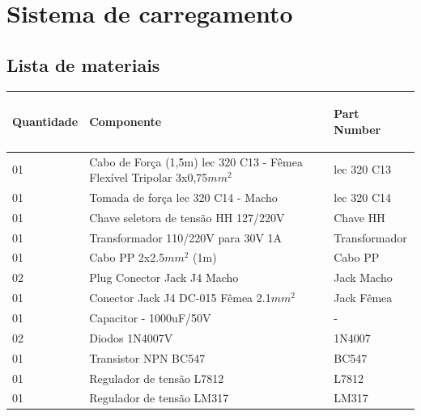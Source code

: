 \chapter{Sistema de carregamento}

\section{Lista de materiais}

\begin{table}[H]
\centering
\begin{tabular}{|m{1.8cm} |m{8.8cm}|m{3.5cm}|}
\hline
\begin{center}Quantidade\end{center} & \begin{center}Componente\end{center} &\begin{center} Part Number\end{center} \\\hline

 01&Cabo de Força (1,5m) lec 320 C13 - Fêmea Flexível Tripolar 3x0,75$mm^2$ & lec 320 C13 \\\hline
 
01 &  Tomada de força lec 320 C14 - Macho
& lec 320 C14 \\\hline
  
01& Chave seletora de tensão HH 127/220V  & Chave HH \\\hline
   
01& Transformador 110/220V para 30V 1A & Transformador \\\hline

01&Cabo PP 2x2.5$mm^2$ (1m) & Cabo PP \\\hline

02&Plug Conector Jack J4  Macho & Jack Macho \\\hline

01& Conector Jack J4 DC-015 Fêmea 2.1$mm^2$ &Jack Fêmea \\\hline

01& Capacitor - 1000uF/50V & - \\\hline

02& Diodos 1N4007V & 1N4007  \\\hline

01& Transistor NPN BC547 & BC547\\\hline

01& Regulador de tensão L7812 & L7812 \\\hline

01& Regulador de tensão LM317 &  LM317 \\\hline


\end{tabular}
\end{table}
